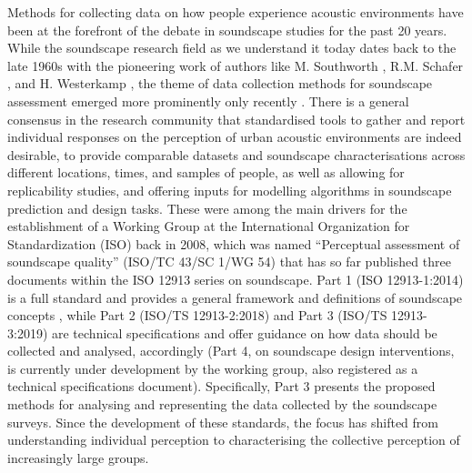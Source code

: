 \documentclass[
  authoryear,
  preprint,
  3p]{elsarticle}
\begin{document}
Methods for collecting data on how people experience acoustic
environments have been at the forefront of the debate in soundscape
studies for the past 20 years. While the soundscape research field as we
understand it today dates back to the late 1960s with the pioneering
work of authors like M. Southworth \citep{Southworth1969sonic}, R.M.
Schafer \citep{SoundscapeOursonicSchafer}, and H. Westerkamp
\citep{westerkamp2002linking}, the theme of data collection methods for
soundscape assessment emerged more prominently only recently
\citep{kang2016ten}. There is a general consensus in the research
community that standardised tools to gather and report individual
responses on the perception of urban acoustic environments are indeed
desirable, to provide comparable datasets and soundscape
characterisations across different locations, times, and samples of
people, as well as allowing for replicability studies, and offering
inputs for modelling algorithms in soundscape prediction and design
tasks. These were among the main drivers for the establishment of a
Working Group at the International Organization for Standardization
(ISO) back in 2008, which was named ``Perceptual assessment of
soundscape quality'' (ISO/TC 43/SC 1/WG 54) that has so far published
three documents within the ISO 12913 series on soundscape. Part 1 (ISO
12913-1:2014) is a full standard and provides a general framework and
definitions of soundscape concepts \citep{ISO12913_1}, while Part 2
(ISO/TS 12913-2:2018) and Part 3 (ISO/TS 12913-3:2019) are technical
specifications and offer guidance on how data should be collected and
analysed, accordingly \citep{ISO12913_2, ISO12913_3} (Part 4, on
soundscape design interventions, is currently under development by the
working group, also registered as a technical specifications document).
Specifically, Part 3 presents the proposed methods for analysing and
representing the data collected by the soundscape surveys. Since the
development of these standards, the focus has shifted from understanding
individual perception to characterising the collective perception of
increasingly large groups.
\end{document}
